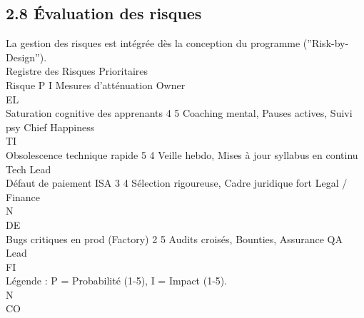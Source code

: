 \documentclass[12pt,landscape,a4paper]{article}
\begin{document}
\subsection{2.8 Évaluation des risques}
La gestion des risques est intégrée dès la conception du programme (”Risk-by-Design”).\\
\vspace{0.5em}
Registre des Risques Prioritaires\\
\vspace{0.5em}
\vspace{0.5em}
\vspace{0.5em}
Risque                                 P   I   Mesures d’atténuation                             Owner\\
\vspace{0.5em}
\vspace{0.5em}
\vspace{0.5em}
\vspace{0.5em}
EL\\
Saturation cognitive des apprenants    4   5   Coaching mental, Pauses actives, Suivi psy        Chief Happiness\\
\vspace{0.5em}
\vspace{0.5em}
\vspace{0.5em}
\vspace{0.5em}
TI\\
Obsolescence technique rapide          5   4   Veille hebdo, Mises à jour syllabus en continu    Tech Lead\\
Défaut de paiement ISA                 3   4   Sélection rigoureuse, Cadre juridique fort        Legal / Finance\\
\vspace{0.5em}
\vspace{0.5em}
\vspace{0.5em}
\vspace{0.5em}
N\\
DE\\
Bugs critiques en prod (Factory)       2   5   Audits croisés, Bounties, Assurance               QA Lead\\
\vspace{0.5em}
\vspace{0.5em}
\vspace{0.5em}
\vspace{0.5em}
FI\\
Légende : P = Probabilité (1-5), I = Impact (1-5).\\
\vspace{0.5em}
\vspace{0.5em}
\vspace{0.5em}
N\\
CO\\
\end{document}
